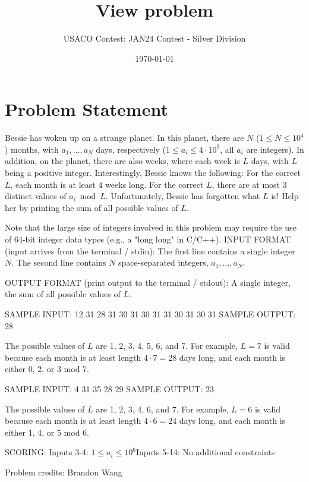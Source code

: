 \documentclass[12pt]{article}
\title{View problem}
\author{USACO Contest: JAN24 Contest - Silver Division}
\date{\today}
\begin{document}
\maketitle

\section*{Problem Statement}


Bessie has woken up on a strange planet.  In this planet, there are $N$
($1\le N\le 10^4$) months, with $a_1, \ldots, a_N$ days, respectively
($1\leq a_i \leq 4 \cdot 10^9$, all $a_i$ are integers). In addition, on the
planet, there are also weeks, where each week is $L$ days, with $L$ being a
positive integer. Interestingly, Bessie knows the following:
 For the correct $L$, each month is at least $4$ weeks long.  For
the correct $L$,  there are at most $3$ distinct values of $a_i\bmod L$.
Unfortunately, Bessie has forgotten what $L$ is! Help her by printing the sum of
all possible values of $L$.

Note that the large size of integers involved in this problem may require the
use of 64-bit integer data types (e.g., a "long long" in C/C++).
INPUT FORMAT (input arrives from the terminal / stdin):
The first line contains a single integer $N$. The second line contains $N$
space-separated integers, $a_1, \ldots, a_N$. 

OUTPUT FORMAT (print output to the terminal / stdout):
A single integer, the sum of all possible values of $L$.

SAMPLE INPUT:
12
31 28 31 30 31 30 31 31 30 31 30 31
SAMPLE OUTPUT: 
28

The possible values of $L$ are 1, 2, 3, 4, 5, 6, and 7.  For example, $L=7$ is
valid because each month is at least length $4 \cdot 7 = 28$ days long, and each
month is either 0, 2, or 3 mod 7. 

SAMPLE INPUT:
4
31 35 28 29
SAMPLE OUTPUT: 
23

The possible values of $L$ are 1, 2, 3, 4, 6, and 7. For example, $L=6$ is valid
because each month is at least length $4 \cdot 6 = 24$ days long, and each month
is either 1, 4, or 5 mod 6. 

SCORING:
Inputs 3-4: $1 \leq a_i \leq 10^6$Inputs 5-14: No additional
constraints


Problem credits: Brandon Wang
\end{document}
